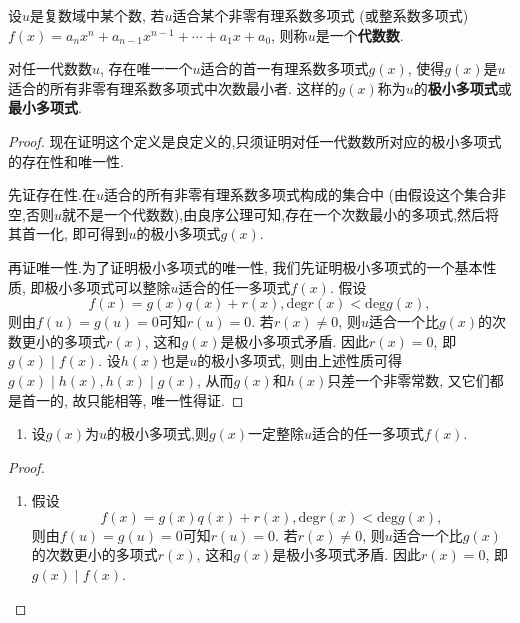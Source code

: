 \documentclass[../../main.tex]{subfiles}
\begin{document}
\begin{definition}[代数数]\label{definition:代数数}
设\(u\)是复数域中某个数, 若\(u\)适合某个非零有理系数多项式 (或整系数多项式)\(f(x)=a_nx^n + a_{n - 1}x^{n - 1}+\cdots+a_1x + a_0\), 则称\(u\)是一个\textbf{代数数}.
\end{definition}

\begin{definition}\label{definition:极小多项式(最小多项式)}
对任一代数数\(u\), 存在唯一一个\(u\)适合的首一有理系数多项式\(g(x)\), 使得\(g(x)\)是\(u\)适合的所有非零有理系数多项式中次数最小者. 这样的\(g(x)\)称为\(u\)的\textbf{极小多项式}或\textbf{最小多项式}.
\end{definition}
\begin{proof}
现在证明这个定义是良定义的,只须证明对任一代数数所对应的极小多项式的存在性和唯一性.

先证存在性.在\(u\)适合的所有非零有理系数多项式构成的集合中 (由假设这个集合非空,否则$u$就不是一个代数数),由良序公理可知,存在一个次数最小的多项式,然后将其首一化, 即可得到\(u\)的极小多项式\(g(x)\). 

再证唯一性.为了证明极小多项式的唯一性, 我们先证明极小多项式的一个基本性质, 即极小多项式可以整除\(u\)适合的任一多项式\(f(x)\). 假设
\[
f(x)=g(x)q(x)+r(x), \mathrm{deg }r(x)<\mathrm{deg }g(x),
\]
则由\(f(u)=g(u)=0\)可知\(r(u)=0\). 若\(r(x)\neq 0\), 则\(u\)适合一个比\(g(x)\)的次数更小的多项式\(r(x)\), 这和\(g(x)\)是极小多项式矛盾. 因此\(r(x)=0\), 即\(g(x)\mid f(x)\). 设\(h(x)\)也是\(u\)的极小多项式, 则由上述性质可得\(g(x)\mid h(x), h(x)\mid g(x)\), 从而\(g(x)\)和\(h(x)\)只差一个非零常数, 又它们都是首一的, 故只能相等, 唯一性得证.
\end{proof}

\begin{proposition}[极小多项式的基本性质]\label{proposition:极小多项式的基本性质}
\begin{enumerate}[(1)]
\item 设$g(x)$为$u$的极小多项式,则$g(x)$一定整除\(u\)适合的任一多项式\(f(x)\).
\end{enumerate}
\end{proposition}
\begin{proof}
\begin{enumerate}[(1)]
\item 假设
\[
f(x)=g(x)q(x)+r(x), \mathrm{deg }r(x)<\mathrm{deg }g(x),
\]
则由\(f(u)=g(u)=0\)可知\(r(u)=0\). 若\(r(x)\neq 0\), 则\(u\)适合一个比\(g(x)\)的次数更小的多项式\(r(x)\), 这和\(g(x)\)是极小多项式矛盾. 因此\(r(x)=0\), 即\(g(x)\mid f(x)\). 
\end{enumerate}
\end{proof}
\end{document}
